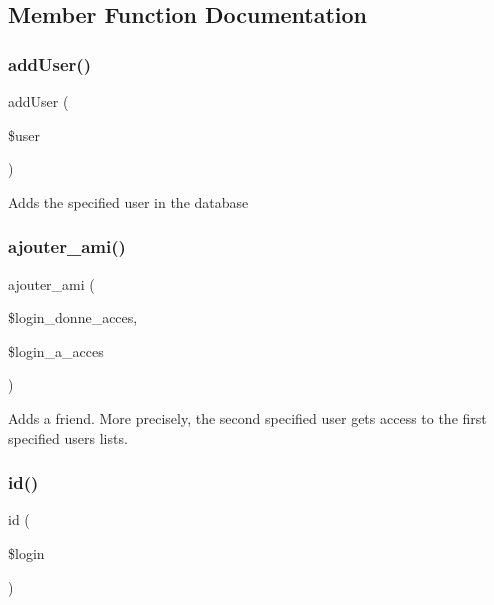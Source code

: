 \subsection{Member Function Documentation}
\mbox{\label{class_user__model_abdfab30e2e8e5562e761a2228af18c3b}} 
\subsubsection{\texorpdfstring{add\+User()}{addUser()}}
{\footnotesize\ttfamily add\+User (\begin{DoxyParamCaption}\item[{}]{\$user }\end{DoxyParamCaption})}

Adds the specified user in the database \mbox{\label{class_user__model_af67174e59f20721772935e2318be5e4a}} 
\subsubsection{\texorpdfstring{ajouter\+\_\+ami()}{ajouter\_ami()}}
{\footnotesize\ttfamily ajouter\+\_\+ami (\begin{DoxyParamCaption}\item[{}]{\$login\+\_\+donne\+\_\+acces,  }\item[{}]{\$login\+\_\+a\+\_\+acces }\end{DoxyParamCaption})}

Adds a friend. More precisely, the second specified user gets access to the first specified user\textquotesingle{}s lists. \mbox{\label{class_user__model_ae3c97430ddfbb524172fe62687493762}} 
\subsubsection{\texorpdfstring{id()}{id()}}
{\footnotesize\ttfamily id (\begin{DoxyParamCaption}\item[{}]{\$login }\end{DoxyParamCaption})}

